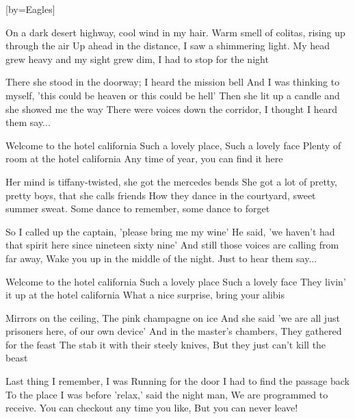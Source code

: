 
[by={Eagles}]





\beginverse
On a dark desert highway, cool wind in my hair. 
Warm smell of colitas, rising up through the air
Up ahead in the distance, I saw a shimmering light.
My head grew heavy and my sight grew dim, I had to stop for the night
\endverse

\beginverse
There she stood in the doorway; I heard the mission bell
And I was thinking to myself, ’this could be heaven or this could be hell’
Then she lit up a candle and she showed me the way
There were voices down the corridor, I thought I heard them say...
\endverse

\beginchorus
Welcome to the hotel california
Such a lovely place, Such a lovely face
Plenty of room at the hotel california
Any time of year, you can find it here
\endchorus

\beginverse
Her mind is tiffany-twisted, she got the mercedes bends
She got a lot of pretty, pretty boys, that she calls friends
How they dance in the courtyard, sweet summer sweat.
Some dance to remember, some dance to forget
\endverse

\beginverse
So I called up the captain, ’please bring me my wine’
He said, ’we haven’t had that spirit here since nineteen sixty nine’
And still those voices are calling from far away,
Wake you up in the middle of the night. Just to hear them say...
\endverse

\beginchorus
Welcome to the hotel california
Such a lovely place
Such a lovely face
They livin’ it up at the hotel california
What a nice surprise, bring your alibis
\endchorus

\beginverse
Mirrors on the ceiling, The pink champagne on ice
And she said ’we are all just prisoners here, of our own device’
And in the master’s chambers, They gathered for the feast
The stab it with their steely knives, But they just can’t kill the beast
\endverse

\beginverse
Last thing I remember, I was Running for the door
I had to find the passage back To the place I was before
’relax,’ said the night man, We are programmed to receive.
You can checkout any time you like, But you can never leave! 
\endverse





\endsong